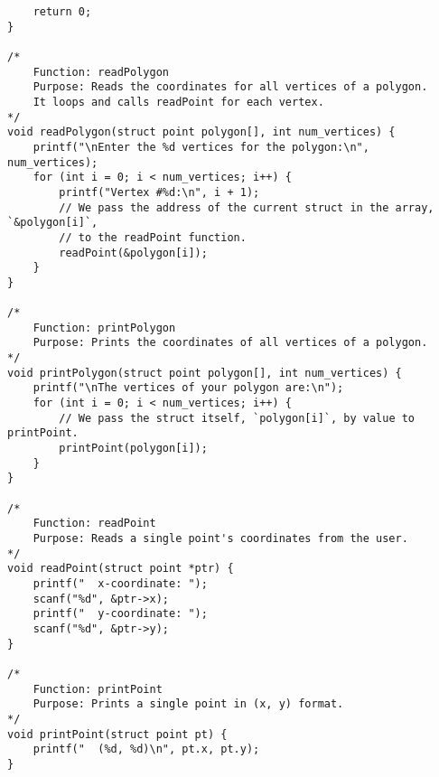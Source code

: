 \documentclass[11pt]{book}
\begin{document}
\begin{verbatim}
    return 0;
}

/*
    Function: readPolygon
    Purpose: Reads the coordinates for all vertices of a polygon.
    It loops and calls readPoint for each vertex.
*/
void readPolygon(struct point polygon[], int num_vertices) {
    printf("\nEnter the %d vertices for the polygon:\n", num_vertices);
    for (int i = 0; i < num_vertices; i++) {
        printf("Vertex #%d:\n", i + 1);
        // We pass the address of the current struct in the array, `&polygon[i]`,
        // to the readPoint function.
        readPoint(&polygon[i]);
    }
}

/*
    Function: printPolygon
    Purpose: Prints the coordinates of all vertices of a polygon.
*/
void printPolygon(struct point polygon[], int num_vertices) {
    printf("\nThe vertices of your polygon are:\n");
    for (int i = 0; i < num_vertices; i++) {
        // We pass the struct itself, `polygon[i]`, by value to printPoint.
        printPoint(polygon[i]);
    }
}

/*
    Function: readPoint
    Purpose: Reads a single point's coordinates from the user.
*/
void readPoint(struct point *ptr) {
    printf("  x-coordinate: ");
    scanf("%d", &ptr->x);
    printf("  y-coordinate: ");
    scanf("%d", &ptr->y);
}

/*
    Function: printPoint
    Purpose: Prints a single point in (x, y) format.
*/
void printPoint(struct point pt) {
    printf("  (%d, %d)\n", pt.x, pt.y);
}

\end{verbatim}
\clearpage
\end{document}
